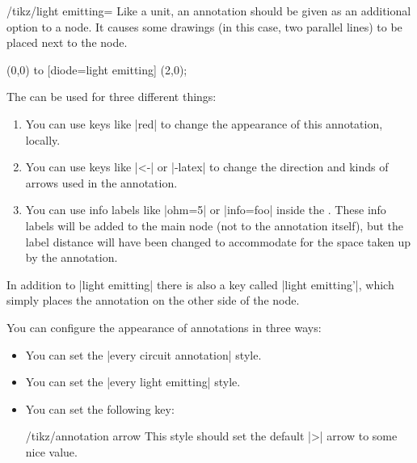 \begin{key}{/tikz/light emitting=}
    Like a unit, an annotation should be given as an additional option to a
    node. It causes some drawings (in this case, two parallel lines) to be
    placed next to the node.
\begin{codeexample}[preamble={\usetikzlibrary{circuits.ee.IEC}}]
 \draw (0,0) to [diode=light emitting] (2,0);
\end{codeexample}

    The  can be used for three different things:
    \begin{enumerate}
        \item You can use keys like |red| to change the appearance of this
            annotation, locally.
        \item You can use keys like |<-|  or |-latex| to change the direction
            and kinds of arrows used in the annotation.
        \item You can use info labels like |ohm=5| or |info=foo| inside the
            . These info labels will be added to the main node
            (not to the annotation itself), but the label distance will have
            been changed to accommodate for the space taken up by the
            annotation.
\begin{codeexample}[preamble={\usetikzlibrary{circuits.ee.IEC}}]
\end{codeexample}
    \end{enumerate}

    In addition to |light emitting| there is also a key called
    |light emitting'|, which simply places the annotation on the other side of
    the node.

    You can configure the appearance of annotations in three ways:
    \begin{itemize}
        \item You can set the |every circuit annotation| style.
        \item You can set the |every light emitting| style.
        \item You can set the following key:
            \begin{stylekey}{/tikz/annotation arrow}
                This style should set the default |>| arrow to some nice value.
            \end{stylekey}
    \end{itemize}
\end{key}

